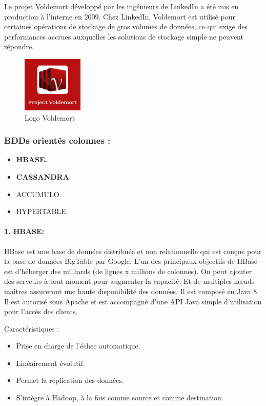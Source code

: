 Le projet Voldemort développé par les ingénieurs de LinkedIn a été mis en production à l’interne en 2009. Chez LinkedIn, Voldemort est utilisé pour certaines opérations de stockage de gros volumes de données, ce qui exige des performances accrues auxquelles les solutions de stockage simple ne peuvent répondre.

\begin{figure}[h]
	\centering
    \includegraphics[scale=0.5]{img/part1/4.8}
    \caption{Logo Voldemort}
\end{figure}

\subsubsection{BDDs orientés colonnes :}

\begin{itemize}[label=\textbullet]
\item \textbf{HBASE.}
\item \textbf{CASSANDRA}
\item ACCUMULO.
\item HYPERTABLE.
\end{itemize}

\paragraph{1. HBASE:}
HBase est une base de données distribuée et non relationnelle qui est conçue pour la base de données BigTable par Google. L'un des principaux objectifs de HBase est d'héberger des milliards (de lignes x millions de colonnes). On peut ajouter des serveurs à tout moment pour augmenter la capacité. Et de multiples nœuds maîtres assureront une haute disponibilité des données. Il est composé en Java 8. Il est autorisé sous Apache et est accompagné d'une API Java simple d'utilisation pour l'accès des clients.

Caractéristiques :
\begin{itemize}[label=]
\item Prise en charge de l'échec automatique.
\item Linéairement évolutif.
\item Permet la réplication des données.
\item S'intègre à Hadoop, à la fois comme source et comme destination.
\end{itemize}

